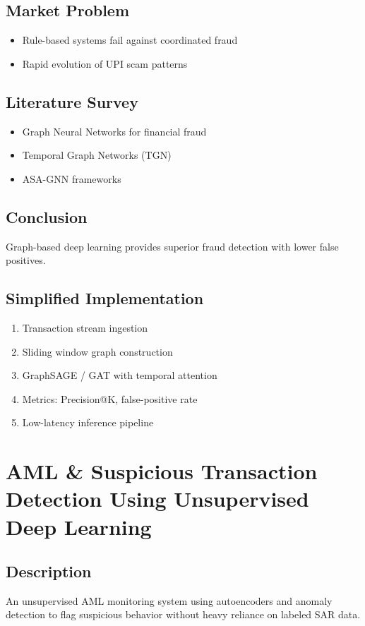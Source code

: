 \documentclass[11pt,a4paper]{article}
\begin{document}
\subsection*{Market Problem}
\begin{itemize}[noitemsep]
    \item Rule-based systems fail against coordinated fraud
    \item Rapid evolution of UPI scam patterns
\end{itemize}

\subsection*{Literature Survey}
\begin{itemize}[noitemsep]
    \item Graph Neural Networks for financial fraud
    \item Temporal Graph Networks (TGN)
    \item ASA-GNN frameworks
\end{itemize}

\subsection*{Conclusion}
Graph-based deep learning provides superior fraud detection with lower false positives.

\subsection*{Simplified Implementation}
\begin{enumerate}[noitemsep]
    \item Transaction stream ingestion
    \item Sliding window graph construction
    \item GraphSAGE / GAT with temporal attention
    \item Metrics: Precision@K, false-positive rate
    \item Low-latency inference pipeline
\end{enumerate}

\section{AML \& Suspicious Transaction Detection Using Unsupervised Deep Learning}

\subsection*{Description}
An unsupervised AML monitoring system using autoencoders and anomaly detection to flag suspicious behavior without heavy reliance on labeled SAR data.
\end{document}
